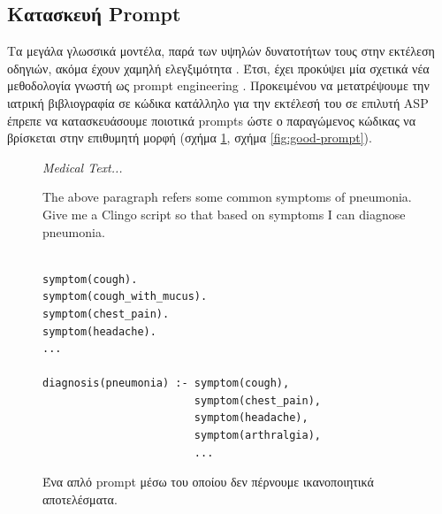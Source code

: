 \documentclass[12pt]{extarticle}
\begin{document}
\subsection{Κατασκευή Prompt}

Τα μεγάλα γλωσσικά μοντέλα, παρά των υψηλών δυνατοτήτων τους στην εκτέλεση οδηγιών, ακόμα 
έχουν χαμηλή ελεγξιμότητα \cite{bowman2023things}.
Έτσι, έχει προκύψει μία σχετικά νέα μεθοδολογία  γνωστή ως prompt engineering \cite{liu2021pretrain, promptingguidePromptEngineering}.
Προκειμένου να μετατρέψουμε την ιατρική βιβλιογραφία σε κώδικα
κατάλληλο για την εκτέλεσή του σε επιλυτή ASP έπρεπε να κατασκευάσουμε 
ποιοτικά prompts ώστε ο παραγώμενος κώδικας να βρίσκεται στην επιθυμητή μορφή (σχήμα \ref{fig:bad-prompt}, σχήμα \ref{fig:good-prompt}).

\begin{figure}[!h]
\centering
\begin{prompt}
\textit{Medical Text...}

The above paragraph refers some common symptoms of pneumonia.
Give me a Clingo script so that based on symptoms I can diagnose pneumonia.
\end{prompt}


\begin{commandline}
\begin{verbatim}

symptom(cough).
symptom(cough_with_mucus).
symptom(chest_pain).
symptom(headache).
...

diagnosis(pneumonia) :- symptom(cough), 
                        symptom(chest_pain), 
                        symptom(headache), 
                        symptom(arthralgia),
                        ...
\end{verbatim}
\end{commandline}

\caption{Ένα απλό prompt μέσω του οποίου δεν πέρνουμε ικανοποιητικά αποτελέσματα.}
\label{fig:bad-prompt}
\end{figure}
\end{document}
